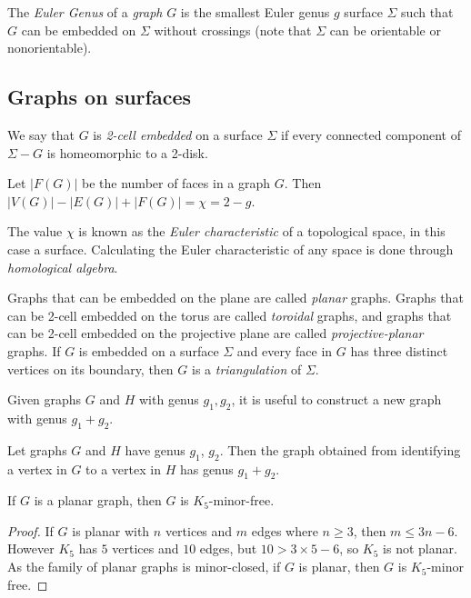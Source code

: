 The \textit{Euler Genus} of a \textit{graph} \(G\) is the smallest Euler genus \(g\) surface \(\Sigma\) such that \(G\) can be embedded on \(\Sigma\) without crossings (note that \(\Sigma\) can be orientable or nonorientable). 


\subsection{Graphs on surfaces}

We say that $G$ is \textit{2-cell embedded} on a surface $\Sigma$ if every connected component of $\Sigma - G$ is homeomorphic to a 2-disk. 

\begin{theorem}\label{thm:Euler_surfaces}
	Let \(|F(G)|\) be the number of faces in a graph \(G\). Then \(|V(G)| - |E(G)| + |F(G)| = \chi = 2 - g\). 
\end{theorem}
The value $\chi$ is known as the \textit{Euler characteristic} of a topological space, in this case a surface. Calculating the Euler characteristic of any space is done through \textit{homological algebra}. 

Graphs that can be embedded on the plane are called \textit{planar} graphs. Graphs that can be 2-cell embedded on the torus are called \textit{toroidal} graphs, and graphs that can be 2-cell embedded on the projective plane are called \textit{projective-planar} graphs.
If $G$ is embedded on a surface $\Sigma$ and every face in $G$ has three distinct vertices on its boundary, then $G$ is a \textit{triangulation} of $\Sigma$. 

Given graphs $G$ and $H$ with genus $g_1, g_2$, it is useful to construct a new graph with genus $g_1 + g_2$. 
\begin{theorem}\label{thm:additivity_genus}
	Let graphs $G$ and $H$ have genus $g_1$, $g_2$. Then the graph obtained from identifying a vertex in $G$ to a vertex in $H$ has genus $g_1 + g_2$. 
\end{theorem}

\begin{theorem}\label{thm:K5_Free_Planar}
	If \(G\) is a planar graph, then \(G\) is \(K_5\)-minor-free.
\end{theorem}
\begin{proof}
	If \(G\) is planar with \(n\) vertices and \(m\) edges where $n \geq 3$, then \(m \leq 3n -6\).
	However \(K_5\) has \(5\) vertices and \(10\) edges, but  \( 10 > 3 \times 5 - 6\), so \(K_5\) is not planar. As the family of planar graphs is minor-closed, if \(G\) is planar, then $G$ is \(K_5\)-minor free.
\end{proof}

